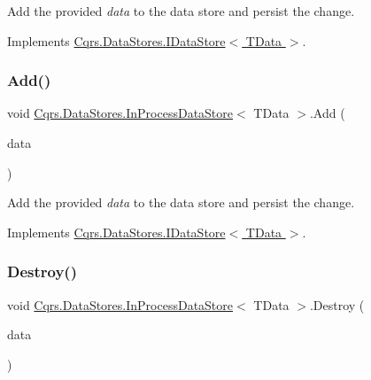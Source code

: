 Add the provided {\itshape data}  to the data store and persist the change. 



Implements \hyperlink{interfaceCqrs_1_1DataStores_1_1IDataStore_a114404daaf37fec9cc5547cd9a17858c}{Cqrs.\+Data\+Stores.\+I\+Data\+Store$<$ T\+Data $>$}.

\mbox{\label{classCqrs_1_1DataStores_1_1InProcessDataStore_ad62504e478f0a907c18ec4aa9b42703a}} 
\subsubsection{\texorpdfstring{Add()}{Add()}\hspace{0.1cm}{\footnotesize\ttfamily [2/2]}}
{\footnotesize\ttfamily void \hyperlink{classCqrs_1_1DataStores_1_1InProcessDataStore}{Cqrs.\+Data\+Stores.\+In\+Process\+Data\+Store}$<$ T\+Data $>$.Add (\begin{DoxyParamCaption}\item[{I\+Enumerable$<$ T\+Data $>$}]{data }\end{DoxyParamCaption})}



Add the provided {\itshape data}  to the data store and persist the change. 



Implements \hyperlink{interfaceCqrs_1_1DataStores_1_1IDataStore_a906f3f2f80db7a549a4170eca4653e26}{Cqrs.\+Data\+Stores.\+I\+Data\+Store$<$ T\+Data $>$}.

\mbox{\label{classCqrs_1_1DataStores_1_1InProcessDataStore_a1fc7a3935f52087f3703b652e77f0b75}} 
\subsubsection{\texorpdfstring{Destroy()}{Destroy()}}
{\footnotesize\ttfamily void \hyperlink{classCqrs_1_1DataStores_1_1InProcessDataStore}{Cqrs.\+Data\+Stores.\+In\+Process\+Data\+Store}$<$ T\+Data $>$.Destroy (\begin{DoxyParamCaption}\item[{T\+Data}]{data }\end{DoxyParamCaption})}



